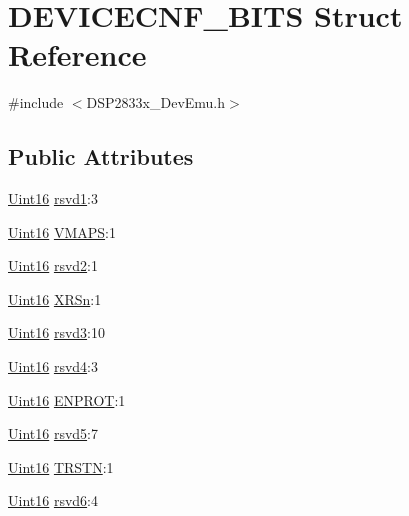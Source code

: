 \hypertarget{struct_d_e_v_i_c_e_c_n_f___b_i_t_s}{}\section{D\+E\+V\+I\+C\+E\+C\+N\+F\+\_\+\+B\+I\+T\+S Struct Reference}
\label{struct_d_e_v_i_c_e_c_n_f___b_i_t_s}


{\ttfamily \#include $<$D\+S\+P2833x\+\_\+\+Dev\+Emu.\+h$>$}

\subsection*{Public Attributes}
\begin{DoxyCompactItemize}
\item 
\hyperlink{_d_s_p2833x___device_8h_a59a9f6be4562c327cbfb4f7e8e18f08b}{Uint16} \hyperlink{struct_d_e_v_i_c_e_c_n_f___b_i_t_s_ae8cef22ca41902e78fc1c91daf13d038}{rsvd1}\+:3
\item 
\hyperlink{_d_s_p2833x___device_8h_a59a9f6be4562c327cbfb4f7e8e18f08b}{Uint16} \hyperlink{struct_d_e_v_i_c_e_c_n_f___b_i_t_s_a14af9e21e021a1b3aef54add60dfe524}{V\+M\+A\+P\+S}\+:1
\item 
\hyperlink{_d_s_p2833x___device_8h_a59a9f6be4562c327cbfb4f7e8e18f08b}{Uint16} \hyperlink{struct_d_e_v_i_c_e_c_n_f___b_i_t_s_a6b6eee8a0524790d8c7cd261635eb8a3}{rsvd2}\+:1
\item 
\hyperlink{_d_s_p2833x___device_8h_a59a9f6be4562c327cbfb4f7e8e18f08b}{Uint16} \hyperlink{struct_d_e_v_i_c_e_c_n_f___b_i_t_s_a538fb89b1cd0fddbb9a5e3e2b0699a21}{X\+R\+Sn}\+:1
\item 
\hyperlink{_d_s_p2833x___device_8h_a59a9f6be4562c327cbfb4f7e8e18f08b}{Uint16} \hyperlink{struct_d_e_v_i_c_e_c_n_f___b_i_t_s_a16b53bdecc8c80d4598b82594bda9e16}{rsvd3}\+:10
\item 
\hyperlink{_d_s_p2833x___device_8h_a59a9f6be4562c327cbfb4f7e8e18f08b}{Uint16} \hyperlink{struct_d_e_v_i_c_e_c_n_f___b_i_t_s_a428d8e39930d521963256ce62b99ebf5}{rsvd4}\+:3
\item 
\hyperlink{_d_s_p2833x___device_8h_a59a9f6be4562c327cbfb4f7e8e18f08b}{Uint16} \hyperlink{struct_d_e_v_i_c_e_c_n_f___b_i_t_s_a2f50c10f77afeb0cf2db8191b085a7ff}{E\+N\+P\+R\+O\+T}\+:1
\item 
\hyperlink{_d_s_p2833x___device_8h_a59a9f6be4562c327cbfb4f7e8e18f08b}{Uint16} \hyperlink{struct_d_e_v_i_c_e_c_n_f___b_i_t_s_a82b1403a3f13b7b436d5c44162675380}{rsvd5}\+:7
\item 
\hyperlink{_d_s_p2833x___device_8h_a59a9f6be4562c327cbfb4f7e8e18f08b}{Uint16} \hyperlink{struct_d_e_v_i_c_e_c_n_f___b_i_t_s_aa18539687ea7713cf0386d1d73f32185}{T\+R\+S\+T\+N}\+:1
\item 
\hyperlink{_d_s_p2833x___device_8h_a59a9f6be4562c327cbfb4f7e8e18f08b}{Uint16} \hyperlink{struct_d_e_v_i_c_e_c_n_f___b_i_t_s_a3c1be2b3c09702cd4cd791212eb1de97}{rsvd6}\+:4
\end{DoxyCompactItemize}


